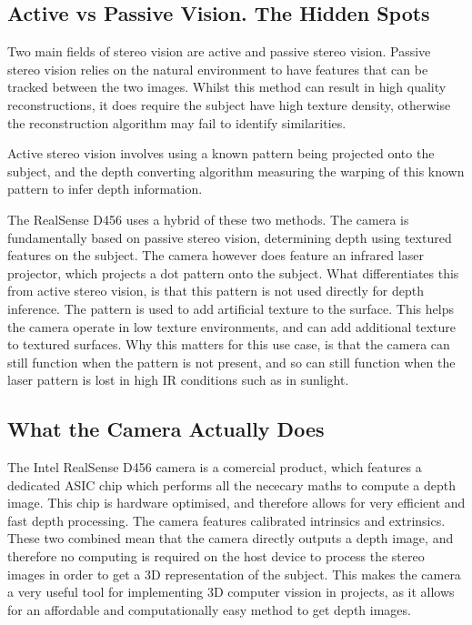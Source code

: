 \subsection{Active vs Passive Vision. The Hidden Spots}
Two main fields of stereo vision are active and passive stereo vision. Passive stereo vision relies on the natural environment to have features that can be tracked between the two images. Whilst this method can result in high quality reconstructions, it does require the subject have high texture density, otherwise the reconstruction algorithm may fail to identify similarities.

Active stereo vision involves using a known pattern being projected onto the subject, and the depth converting algorithm measuring the warping of this known pattern to infer depth information.

The RealSense D456 uses a hybrid of these two methods. The camera is fundamentally based on passive stereo vision, determining depth using textured features on the subject. The camera however does feature an infrared laser projector, which projects a dot pattern onto the subject. What differentiates this from active stereo vision, is that this pattern is not used directly for depth inference. The pattern is used to add artificial texture to the surface. This helps the camera operate in low texture environments, and can add additional texture to textured surfaces. Why this matters for this use case, is that the camera can still function when the pattern is not present, and so can still function when the laser pattern is lost in high IR conditions such as in sunlight.


\subsection{What the Camera Actually Does}
The Intel RealSense D456 camera is a comercial product, which features a dedicated ASIC chip which performs all the nececary maths to compute a depth image. This chip is hardware optimised, and therefore allows for very efficient and fast depth processing. The camera features calibrated intrinsics and extrinsics. These two combined mean that the camera directly outputs a depth image, and therefore no computing is required on the host device to process the stereo images in order to get a 3D representation of the subject. This makes the camera a very useful tool for implementing 3D computer vission in projects, as it allows for an affordable and computationally easy method to get depth images.

